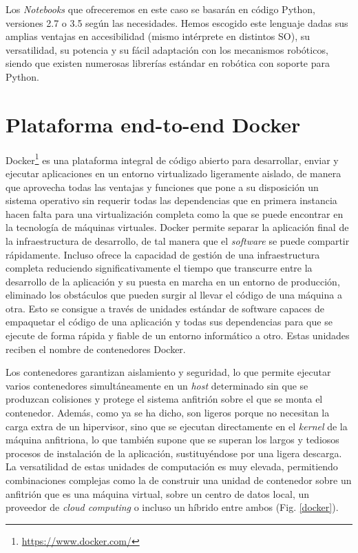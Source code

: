 Los \textit{Notebooks} que ofreceremos en este caso se basarán en código Python, versiones 2.7 o 3.5 según las necesidades. Hemos escogido este lenguaje dadas sus amplias ventajas en accesibilidad (mismo intérprete en distintos SO), su versatilidad, su potencia y su fácil adaptación con los mecanismos robóticos, siendo que existen numerosas librerías estándar en robótica con soporte para Python.

\section{Plataforma end-to-end Docker}

Docker\footnote{\url{https://www.docker.com/}} es una plataforma integral de código abierto para desarrollar, enviar y ejecutar aplicaciones en un entorno virtualizado ligeramente aislado, de manera que aprovecha todas las ventajas y funciones que pone a su disposición un sistema operativo sin requerir todas las dependencias que en primera instancia hacen falta para una virtualización completa como la que se puede encontrar en la tecnología de máquinas virtuales. Docker permite separar la aplicación final de la infraestructura de desarrollo, de tal manera que el \textit{software} se puede compartir rápidamente. Incluso ofrece la capacidad de gestión de una infraestructura completa reduciendo significativamente el tiempo que transcurre entre la desarrollo de la aplicación y su puesta en marcha en un entorno de producción, eliminado los obstáculos que pueden surgir al llevar el código de una máquina a otra. Esto se consigue a través de unidades estándar de software capaces de empaquetar el código de una aplicación y todas sus dependencias para que se ejecute de forma rápida y fiable de un entorno informático a otro. Estas unidades reciben el nombre de contenedores Docker.

Los contenedores garantizan aislamiento y seguridad, lo que permite ejecutar varios contenedores simultáneamente en un \textit{host} determinado sin que se produzcan colisiones y protege el sistema anfitrión sobre el que se monta el contenedor. Además, como ya se ha dicho, son ligeros porque no necesitan la carga extra de un hipervisor, sino que se ejecutan directamente en el \textit{kernel} de la máquina anfitriona, lo que también supone que se superan los largos y tediosos procesos de instalación de la aplicación, sustituyéndose por una ligera descarga. La versatilidad de estas unidades de computación es muy elevada, permitiendo combinaciones complejas como la de construir una unidad de contenedor sobre un anfitrión que es una máquina virtual, sobre un centro de datos local, un proveedor de \textit{cloud computing} o incluso un híbrido entre ambos (Fig. \ref{docker}).

